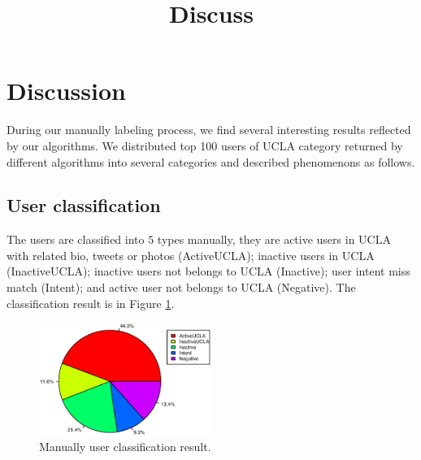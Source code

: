 \documentclass{article}
\begin{document}
\title{Discuss}
\maketitle \else \fi


\section{Discussion}\label{sec:discussion}
During our manually labeling process, we find several interesting results reflected by our algorithms. We distributed top 100 users of UCLA category returned by different algorithms into several categories and described phenomenons as follows.

\subsection{User classification}
The users are classified into $5$ types manually, they are active users in UCLA with related bio, tweets or photos (ActiveUCLA); inactive users in UCLA (InactiveUCLA); inactive users not belongs to UCLA (Inactive); user intent miss match (Intent); and active user not belongs to UCLA (Negative). The classification result is in Figure \ref{fig:userclass}.

\begin{figure}[h]
\centering
\includegraphics[width=0.5\textwidth]{experiment/uc.eps}
\caption{Manually user classification result.}
\label{fig:userclass}
\end{figure}
\end{document}
